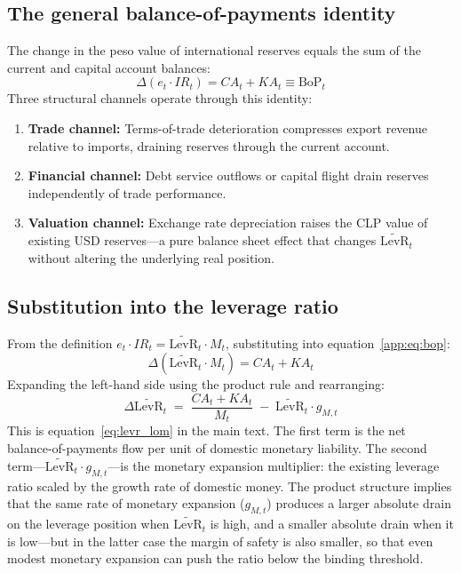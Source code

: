 \subsection{The general balance-of-payments identity}
\label{app:bop_identity}

The change in the peso value of international reserves equals the sum of
the current and capital account balances:
%
\begin{equation}
\label{app:eq:bop}
\Delta(e_t \cdot IR_t) = CA_t + KA_t \equiv \text{BoP}_t
\end{equation}
%
Three structural channels operate through this identity:

\begin{enumerate}
\item \textbf{Trade channel:} Terms-of-trade deterioration compresses
  export revenue relative to imports, draining reserves through the
  current account.
\item \textbf{Financial channel:} Debt service outflows or capital flight
  drain reserves independently of trade performance.
\item \textbf{Valuation channel:} Exchange rate depreciation raises the
  CLP value of existing USD reserves---a pure balance sheet effect that
  changes $\widetilde{\text{LevR}}_t$ without altering the underlying
  real position.
\end{enumerate}


\subsection{Substitution into the leverage ratio}
\label{app:levr_substitution}

From the definition $e_t \cdot IR_t = \widetilde{\text{LevR}}_t \cdot
M_t$, substituting into equation~\eqref{app:eq:bop}:
%
\begin{equation}
\label{app:eq:levr_sub}
\Delta\!\left(\widetilde{\text{LevR}}_t \cdot M_t\right) = CA_t + KA_t
\end{equation}
%
Expanding the left-hand side using the product rule and rearranging:
%
\begin{equation}
\label{app:eq:levr_lom}
\boxed{\;
\Delta\widetilde{\text{LevR}}_t \;=\;
\frac{CA_t + KA_t}{M_t}
\;-\; \widetilde{\text{LevR}}_t \cdot g_{M,t}
\;}
\end{equation}
%
This is equation~\eqref{eq:levr_lom} in the main text. The first term is
the net balance-of-payments flow per unit of domestic monetary liability.
The second term---$\widetilde{\text{LevR}}_t \cdot g_{M,t}$---is the
monetary expansion multiplier: the existing leverage ratio scaled by the
growth rate of domestic money. The product structure implies that the same
rate of monetary expansion ($g_{M,t}$) produces a larger absolute drain on
the leverage position when $\widetilde{\text{LevR}}_t$ is high, and a
smaller absolute drain when it is low---but in the latter case the margin
of safety is also smaller, so that even modest monetary expansion can
push the ratio below the binding threshold.



